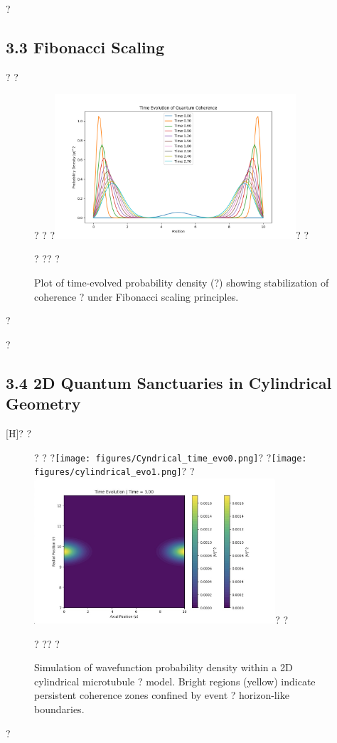 ?\subsection{3.3  Fibonacci Scaling}?
?\begin{figure}[H]?
?\centering
?\includegraphics[width=0.8\textwidth]{figures/fibonacci_wavefunction_evolution.png}?
?\caption{Plot of time-evolved probability density (?) showing stabilization of coherence ?
under Fibonacci scaling principles.}?
?\label{fig 2:fibonacci_scaling}?
?\end{figure}?

?\subsection{3.4  2D Quantum Sanctuaries in Cylindrical Geometry}[H]?
?\begin{figure}[H]?
?\centering
?\texttt{[image: figures/Cyndrical\_time\_evo0.png]}?
?\texttt{[image: figures/cylindrical\_evo1.png]}?
?\includegraphics[width=0.8\textwidth]{figures/cylindrical_evo3.png}?
?\caption{Simulation of wavefunction probability density within a 2D cylindrical microtubule ?
model. Bright regions (yellow) indicate persistent coherence zones confined by event ?
horizon-like boundaries.}?
?\label{fig 3:Cylindrical_event_horizon}?
?\end{figure}?

